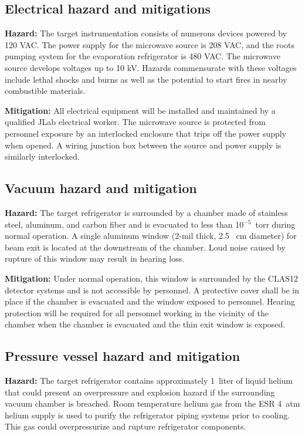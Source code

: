 \subsection{Electrical hazard and mitigations}
{\bf Hazard:} The target instrumentation consists of numerous devices powered by 120 VAC.  The power supply for the microwave source is 208 VAC, and the roots pumping system for the evaporation refrigerator is 480 VAC.  The microwave source develops voltages up to 10 kV.  Hazards commensurate with these voltages include lethal shocks and burns as well as the potential to start fires in nearby combustible materials.

{\bf Mitigation:} All electrical equipment will be installed and maintained by a qualified JLab electrical worker.  The microwave source is protected from personnel exposure by an interlocked enclosure that trips off the
power supply when opened.  A wiring junction box between the source and power supply is similarly interlocked.
 
\subsection{Vacuum hazard and mitigation}
{\bf Hazard:} The target refrigerator is surrounded by a chamber made of stainless steel, aluminum, and
carbon fiber and is evacuated to less than 10$^{-5}$~torr during normal operation.   A single aluminum
window (2-mil thick, 2.5~ cm diameter) for beam exit is located at the downstream of the chamber.  
Loud noise caused by rupture of this window may result in hearing loss.

{\bf Mitigation:} Under normal operation, this window is surrounded by the CLAS12 detector systems and is not accessible by personnel.  A protective cover shall be in place if the chamber is evacuated and the window exposed to personnel.  Hearing protection will be required for all personnel working in the vicinity of the chamber when the chamber is evacuated and the thin exit window is exposed.


\subsection{Pressure vessel hazard and mitigation}
{\bf Hazard:} The target refrigerator contains approximately 1~liter of liquid helium that could present an
overpressure and explosion hazard if the surrounding vacuum chamber is breached.  Room temperature
helium gas from the ESR 4~atm helium supply is used to purify the refrigerator piping systems prior
to cooling.  This gas could overpressurize and rupture refrigerator components.

